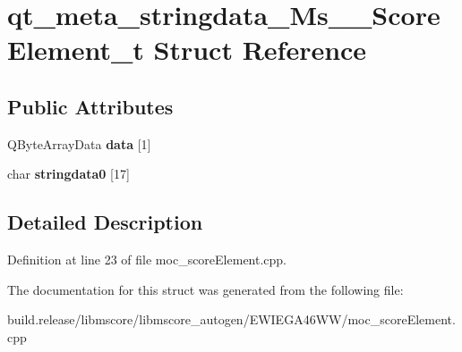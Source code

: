 \hypertarget{structqt__meta__stringdata___ms_____score_element__t}{}\section{qt\+\_\+meta\+\_\+stringdata\+\_\+\+Ms\+\_\+\+\_\+\+Score\+Element\+\_\+t Struct Reference}
\label{structqt__meta__stringdata___ms_____score_element__t}
\subsection*{Public Attributes}
\begin{DoxyCompactItemize}
\item 
\mbox{\label{structqt__meta__stringdata___ms_____score_element__t_a425b8c2eb01382fc5012b60b03b2a85b}} 
Q\+Byte\+Array\+Data {\bfseries data} \mbox{[}1\mbox{]}
\item 
\mbox{\label{structqt__meta__stringdata___ms_____score_element__t_a983f9c383b1940978adb0e864d57a8cb}} 
char {\bfseries stringdata0} \mbox{[}17\mbox{]}
\end{DoxyCompactItemize}


\subsection{Detailed Description}


Definition at line 23 of file moc\+\_\+score\+Element.\+cpp.



The documentation for this struct was generated from the following file\+:\begin{DoxyCompactItemize}
\item 
build.\+release/libmscore/libmscore\+\_\+autogen/\+E\+W\+I\+E\+G\+A46\+W\+W/moc\+\_\+score\+Element.\+cpp\end{DoxyCompactItemize}
